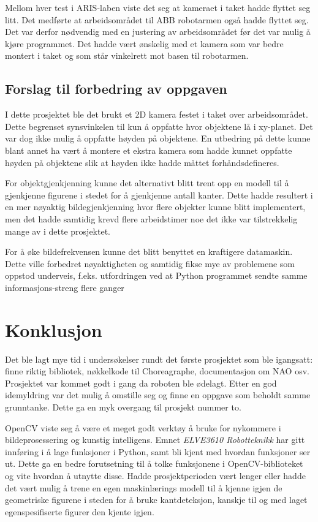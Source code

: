 \documentclass[conference]{IEEEtran}
\begin{document}
        Mellom hver test i ARIS-laben viste det seg at kameraet i taket hadde flyttet seg litt. Det medførte at arbeidsområdet til ABB robotarmen også 
        hadde flyttet seg. Det var derfor nødvendig med en justering av arbeidsområdet før det var mulig å kjøre programmet. Det hadde vært ønskelig med 
        et kamera som var bedre montert i taket og som står vinkelrett mot basen til robotarmen.

    \subsection{Forslag til forbedring av oppgaven}
        I dette prosjektet ble det brukt et 2D kamera festet i taket over arbeidsområdet. Dette begrenset synsvinkelen til kun å oppfatte hvor objektene 
        lå i xy-planet. Det var dog ikke mulig å oppfatte høyden på objektene. En utbedring på dette kunne blant annet ha vært å montere et ekstra kamera 
        som hadde kunnet oppfatte høyden på objektene slik at høyden ikke hadde måttet forhåndsdefineres. 

        For objektgjenkjenning kunne det alternativt blitt trent opp en modell til å gjenkjenne figurene i stedet for å gjenkjenne antall kanter. Dette 
        hadde resultert i en mer nøyaktig bildegjenkjenning hvor flere objekter kunne blitt implementert, men det hadde samtidig krevd flere arbeidstimer 
        noe det ikke var tilstrekkelig mange av i dette prosjektet.  

        For å øke bildefrekvensen kunne det blitt benyttet en kraftigere datamaskin. Dette ville forbedret nøyaktigheten og samtidig fikse mye av 
        problemene som oppstod underveis, f.eks. utfordringen ved at Python programmet sendte samme informasjons-streng flere ganger

    
\section{Konklusjon}
    Det ble lagt mye tid i undersøkelser rundt det første prosjektet som ble igangsatt: finne riktig bibliotek, nøkkelkode til Choreagraphe, 
    documentasjon om NAO osv. Prosjektet var kommet godt i gang da roboten ble ødelagt. Etter en god idemyldring var det mulig å omstille 
    seg og finne en oppgave som beholdt samme grunntanke. Dette ga en myk overgang til prosjekt nummer to.

    OpenCV viste seg å være et meget godt verktøy å bruke for nykommere i bildeprosessering og kunstig intelligens. Emnet \textit{ELVE3610 Robotteknikk} har gitt innføring i å lage funksjoner i Python, samt bli kjent med hvordan funksjoner ser ut. Dette ga en bedre forutsetning til å tolke funksjonene i OpenCV-biblioteket og vite hvordan å utnytte disse. Hadde prosjektperioden vært lenger eller  hadde det vært mulig å trene en egen maskinlærings modell til å kjenne igjen de geometriske figurene i steden for å bruke kantdeteksjon, kanskje til og med laget egenspesifiserte figurer den kjente igjen. 
\end{document}

